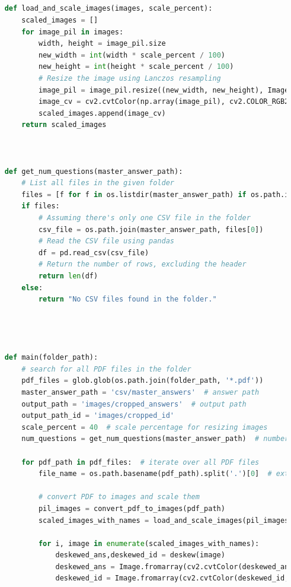 \documentclass[twocolumn]{article}
\begin{document}
\begin{lstlisting}[language=Python, caption=crop\_pdf\_input.py]
    
    
    
    
    def load_and_scale_images(images, scale_percent):
        scaled_images = []
        for image_pil in images:
            width, height = image_pil.size
            new_width = int(width * scale_percent / 100)
            new_height = int(height * scale_percent / 100)
            # Resize the image using Lanczos resampling
            image_pil = image_pil.resize((new_width, new_height), Image.Resampling.LANCZOS)
            image_cv = cv2.cvtColor(np.array(image_pil), cv2.COLOR_RGB2BGR)
            scaled_images.append(image_cv)
        return scaled_images
    
    
    
    def get_num_questions(master_answer_path):
        # List all files in the given folder
        files = [f for f in os.listdir(master_answer_path) if os.path.isfile(os.path.join(master_answer_path, f)) and f.endswith('.csv')]
        if files:
            # Assuming there's only one CSV file in the folder
            csv_file = os.path.join(master_answer_path, files[0])
            # Read the CSV file using pandas
            df = pd.read_csv(csv_file)
            # Return the number of rows, excluding the header
            return len(df)
        else:
            return "No CSV files found in the folder."
    
    
    
    
    def main(folder_path):
        # search for all PDF files in the folder
        pdf_files = glob.glob(os.path.join(folder_path, '*.pdf'))
        master_answer_path = 'csv/master_answers'  # answer path
        output_path = 'images/cropped_answers'  # output path
        output_path_id = 'images/cropped_id'
        scale_percent = 40  # scale percentage for resizing images
        num_questions = get_num_questions(master_answer_path)  # number of questions in the answer key
    
        for pdf_path in pdf_files:  # iterate over all PDF files
            file_name = os.path.basename(pdf_path).split('.')[0]  # extract the file name without extension
            
            # convert PDF to images and scale them
            pil_images = convert_pdf_to_images(pdf_path)
            scaled_images_with_names = load_and_scale_images(pil_images, scale_percent)
            
            for i, image in enumerate(scaled_images_with_names):
                deskewed_ans,deskewed_id = deskew(image)
                deskewed_ans = Image.fromarray(cv2.cvtColor(deskewed_ans, cv2.COLOR_BGR2RGB))
                deskewed_id = Image.fromarray(cv2.cvtColor(deskewed_id, cv2.COLOR_BGR2RGB))
    

\end{lstlisting}
\end{document}
